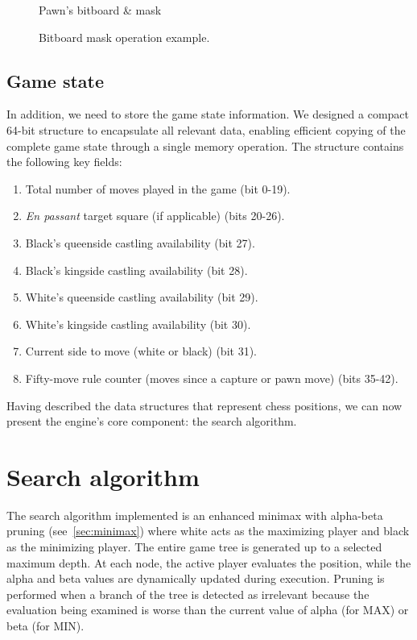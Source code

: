 \begin{figure}[H]
\begin{minipage}[c]{0.3\textwidth}
        \caption*{Pawn's bitboard \& mask}
    \end{minipage}
    \caption{Bitboard mask operation example.}\label{fig:bitboardMaskOperation}
    \vspace{-\baselineskip}
\end{figure}

\newpage

\subsection*{Game state}

\noindent In addition, we need to store the game state information. We designed a compact 64-bit structure to encapsulate all relevant data, enabling efficient copying of the complete game state through a single memory operation. The structure contains the following key fields:

\begin{enumerate}
    \item Total number of moves played in the game (bit 0-19). 
    \item \textit{En passant} target square (if applicable) (bits 20-26).
    \item Black's queenside castling availability (bit 27).
    \item Black's kingside castling availability (bit 28).
    \item White's queenside castling availability (bit 29).
    \item White's kingside castling availability (bit 30).
    \item Current side to move (white or black) (bit 31).
    \item Fifty-move rule counter (moves since a capture or pawn move) (bits 35-42).
\end{enumerate}

\noindent Having described the data structures that represent chess positions, we can now present the engine's core component: the search algorithm.

\section{Search algorithm}

The search algorithm implemented is an enhanced minimax with alpha-beta pruning (see~\cref{sec:minimax}) where white acts as the maximizing player and black as the minimizing player. The entire game tree is generated up to a selected maximum depth. At each node, the active player evaluates the position, while the alpha and beta values are dynamically updated during execution. Pruning is performed when a branch of the tree is detected as irrelevant because the evaluation being examined is worse than the current value of alpha (for MAX) or beta (for MIN).

